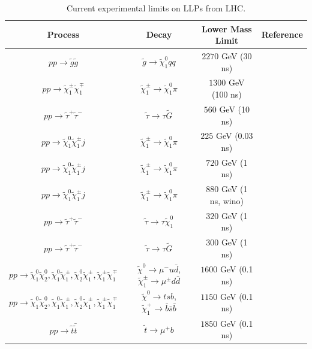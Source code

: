 \documentclass[a4paper,11pt]{article}
\begin{document}
\begin{table}
  
  \centering 
    \begin{tabular}{cccc}
    Process  & Decay & Lower Mass Limit & Reference\\
    \hline
$pp\to \tilde{g}\tilde{g}$  & $\tilde{g}\to\tilde{\chi}^0_1qq$ &  
$2270$ GeV (30 ns) &     \cite{ATLAS:2025fdm}         \\%
$pp\to\tilde{\chi}^\pm_1\tilde{\chi}^\mp_1$  & $\tilde{\chi}^\pm_1\to \tilde{\chi}^0_1\pi$ &  
$1300$ GeV (100 ns)  &    \cite{ATLAS:2025fdm}       \\%
$pp\to \tilde{\tau}^+\tilde{\tau}^-$  & $\tilde{\tau}\to\tau\tilde{G}$  & $560$ GeV (10 ns)  &    \cite{ATLAS:2025fdm}       \\%
$pp\to \tilde{\chi}^0_1\tilde{\chi}^\pm_1j$  & $\tilde{\chi}^\pm_1\to \tilde{\chi}^0_1\pi$  & $225$ GeV (0.03 ns)  &    \cite{ATLAS:2026hnb}       \\%
$pp\to \tilde{\chi}^0_1\tilde{\chi}^\pm_1j$  & $\tilde{\chi}^\pm_1\to \tilde{\chi}^0_1\pi$  & $720$ GeV (1 ns)  &    \cite{ATLAS:2026hnb}       \\%
$pp\to \tilde{\chi}^0_1\tilde{\chi}^\pm_1j$  & $\tilde{\chi}^\pm_1\to \tilde{\chi}^0_1\pi$  & $880$ GeV (1 ns, wino)  &    \cite{ATLAS:2026hnb}       \\%
$pp\to \tilde{\tau}^+\tilde{\tau}^-$  & $\tilde{\tau}\to\tau\tilde{\chi}^0_1$  & $320$ GeV (1 ns) &    \cite{ATLAS:2026hnb}       \\%
$pp\to \tilde{\tau}^+\tilde{\tau}^-$  & $\tilde{\tau}\to\tau\tilde{G}$  & $300$ GeV (1 ns) &    \cite{ATLAS:2026hnb}       \\%
$pp\to \tilde{\chi}^0_1\tilde{\chi}^0_2, \tilde{\chi}^0_1\tilde{\chi}^\pm_1, \tilde{\chi}^0_2\tilde{\chi}^\pm_1, \tilde{\chi}^\pm_1\tilde{\chi}^\mp_1$  & $\tilde{\chi}^0\to\mu^-u\bar{d}$, $\tilde{\chi}^\pm_1\to \mu^\pm d\bar{d}$  & $1600$ GeV (0.1 ns)  &    \cite{ATLAS:2026aej}       \\%
$pp\to \tilde{\chi}^0_1\tilde{\chi}^0_2, \tilde{\chi}^0_1\tilde{\chi}^\pm_1, \tilde{\chi}^0_2\tilde{\chi}^\pm_1, \tilde{\chi}^\pm_1\tilde{\chi}^\mp_1$  & $\tilde{\chi}^0\to tsb$, $\tilde{\chi}^+_1\to \bar{b}\bar{s}\bar{b}$  & $1150$ GeV (0.1 ns) &    \cite{ATLAS:2026aej}       \\%
$pp\to \tilde{t}\bar{\tilde{t}}$  & $\tilde{t}\to\mu^+b$  & $1850$ GeV (0.1 ns) &    \cite{ATLAS:2026aej}       \\%
    \hline
    \end{tabular}
\caption{Current experimental limits on LLPs from LHC.} 
\label{table:vll}
  \end{table}
\end{document}
